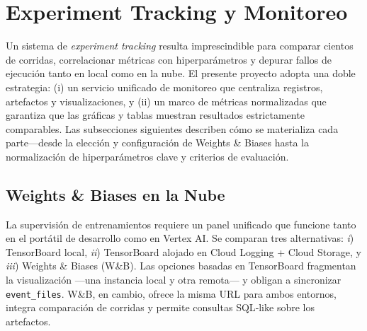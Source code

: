 \section{Experiment Tracking y Monitoreo}\label{sec:tracking}

Un sistema de \textit{experiment tracking} resulta imprescindible para comparar cientos de corridas, correlacionar métricas con hiperparámetros y depurar fallos de ejecución tanto en local como en la nube.
El presente proyecto adopta una doble estrategia: (i) un servicio unificado de monitoreo que centraliza registros, artefactos y visualizaciones, y (ii) un marco de métricas normalizadas que garantiza que las gráficas y tablas muestran resultados estrictamente comparables.
Las subsecciones siguientes describen cómo se materializa cada parte—desde la elección y configuración de Weights \& Biases hasta la normalización de hiperparámetros clave y criterios de evaluación.

\subsection{Weights \& Biases en la Nube}\label{ssec:wandb}

La supervisión de entrenamientos requiere un panel unificado que funcione tanto en el portátil de desarrollo como en Vertex AI.
Se comparan tres alternativas:
\textit{i}) TensorBoard local,
\textit{ii}) TensorBoard alojado en Cloud Logging + Cloud Storage, y
\textit{iii}) Weights \& Biases (W\&B).
Las opciones basadas en TensorBoard fragmentan la visualización —una instancia local y otra remota— y obligan a sincronizar \texttt{event\_files}.
W\&B, en cambio, ofrece la misma URL para ambos entornos, integra comparación de corridas y permite consultas SQL‐like sobre los artefactos.

